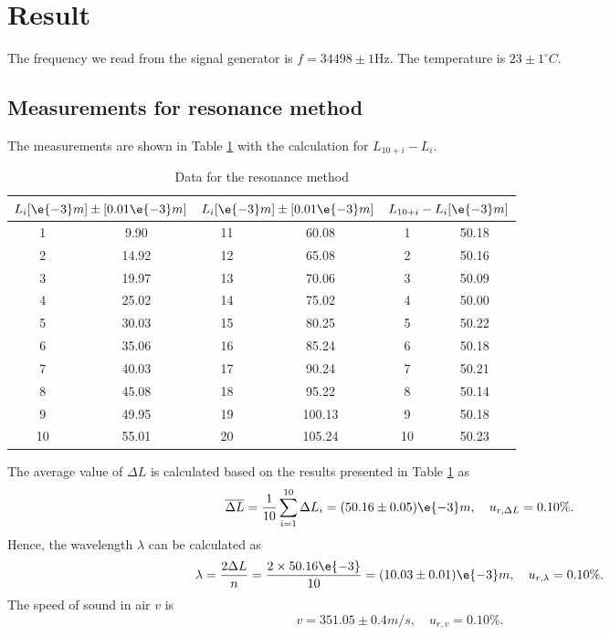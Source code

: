 \section{Result}

The frequency we read from the signal generator is $f=34498 \pm 1$Hz. The
temperature is $23 \pm 1 ^\circ C$.

\subsection{Measurements for resonance method}
    The measurements are shown in Table \ref{data_res} with the calculation for $L_{10+i}-L_i$.
    \begin{table}[h] \small
        \centering
        \begin{tabular}{|c|c|c|c|c|c|}
        \hline
            \multicolumn{2}{|c|}{$L_i[\e{-3}m]\pm[0.01\e{-3}m]$} & 
            \multicolumn{2}{|c|}{$L_i[\e{-3}m]\pm[0.01\e{-3}m]$} &
            \multicolumn{2}{|c|}{$L_{10+i}-L_i[\e{-3}m]$}\\\hline
            1 & 9.90 & 11 & 60.08 & 1 & 50.18 \\\hline
            2 & 14.92 & 12 & 65.08 & 2 & 50.16 \\\hline
            3 & 19.97 & 13 & 70.06 & 3 & 50.09 \\\hline
            4 & 25.02 & 14 & 75.02 & 4 & 50.00 \\\hline
            5 & 30.03 & 15 & 80.25 & 5 & 50.22 \\\hline
            6 & 35.06 & 16 & 85.24 & 6 & 50.18 \\\hline
            7 & 40.03 & 17 & 90.24 & 7 & 50.21 \\\hline
            8 & 45.08 & 18 & 95.22 & 8 & 50.14 \\\hline
            9 & 49.95 & 19 & 100.13 & 9 & 50.18 \\\hline
            10 & 55.01 & 20 & 105.24 & 10 & 50.23 \\\hline
        \end{tabular}
        \caption{Data for the resonance method}\label{data_res}
    \end{table}
    The average value of $\Delta L$ is calculated  based on the results presented in Table \ref{data_res} as
    \[
        \overline{\Delta L}=\frac{1}{10}\sum_{i=1}^{10}\Delta L_i=(50.16\pm 0.05)\e{-3}m,\quad u_{r,\Delta L}=0.10\%.
    \]
    Hence, the wavelength $\lambda$ can be calculated as
    \[
        \lambda=\frac{2\Delta L}{n}=\frac{2\times50.16\e{-3}}{10}=(10.03\pm0.01)\e{-3}m,\quad u_{r,\lambda}=0.10\%.
    \]
    The speed of sound in air $v$ is
    \[
        v=351.05\pm0.4 m/s,\quad u_{r,v}=0.10\%.
    \]

